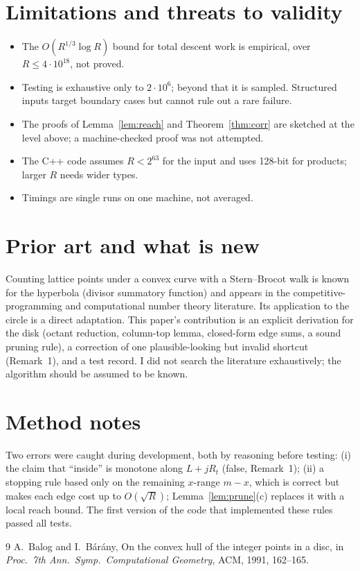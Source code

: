 \documentclass[11pt]{article}
\theoremstyle{remark}
\begin{document}
\section{Limitations and threats to validity}
\begin{itemize}\setlength\itemsep{0pt}
\item The $O(R^{1/3}\log R)$ bound for total descent work is empirical, over $R\le4\cdot10^{18}$, not proved.
\item Testing is exhaustive only to $2\cdot10^6$; beyond that it is sampled. Structured inputs target boundary cases but cannot rule out a rare failure.
\item The proofs of Lemma~\ref{lem:reach} and Theorem~\ref{thm:corr} are sketched at the level above; a machine-checked proof was not attempted.
\item The C++ code assumes $R<2^{63}$ for the input and uses 128-bit for products; larger $R$ needs wider types.
\item Timings are single runs on one machine, not averaged.
\end{itemize}

\section{Prior art and what is new}\label{sec:prior}
Counting lattice points under a convex curve with a Stern--Brocot walk is known for the hyperbola (divisor summatory function) and appears in the competitive-programming and computational number theory literature. Its application to the circle is a direct adaptation. This paper's contribution is an explicit derivation for the disk (octant reduction, column-top lemma, closed-form edge sums, a sound pruning rule), a correction of one plausible-looking but invalid shortcut (Remark~1), and a test record. I did not search the literature exhaustively; the algorithm should be assumed to be known.

\section{Method notes}
Two errors were caught during development, both by reasoning before testing: (i) the claim that ``inside'' is monotone along $L+jR_t$ (false, Remark~1); (ii) a stopping rule based only on the remaining $x$-range $m-x$, which is correct but makes each edge cost up to $O(\sqrt R)$; Lemma~\ref{lem:prune}(c) replaces it with a local reach bound. The first version of the code that implemented these rules passed all tests.

\begin{thebibliography}{9}
 A.~Balog and I.~B\'ar\'any, On the convex hull of the integer points in a disc, in \emph{Proc.\ 7th Ann.\ Symp.\ Computational Geometry}, ACM, 1991, 162--165.
\end{thebibliography}
\end{document}
